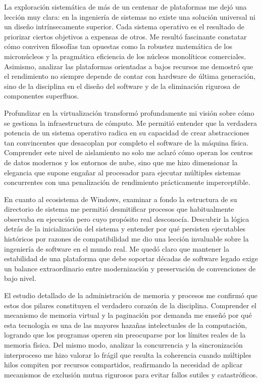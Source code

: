 \documentclass[12pt]{article}
\begin{document}
La exploración sistemática de más de un centenar de plataformas me dejó una lección muy clara: en la ingeniería de sistemas no existe una solución universal ni un diseño intrínsecamente superior. Cada sistema operativo es el resultado de priorizar ciertos objetivos a expensas de otros. Me resultó fascinante constatar cómo conviven filosofías tan opuestas como la robustez matemática de los micronúcleos y la pragmática eficiencia de los núcleos monolíticos comerciales. Asimismo, analizar las plataformas orientadas a bajos recursos me demostró que el rendimiento no siempre depende de contar con hardware de última generación, sino de la disciplina en el diseño del software y de la eliminación rigurosa de componentes superfluos.

Profundizar en la virtualización transformó profundamente mi visión sobre cómo se gestiona la infraestructura de cómputo. Me permitió entender que la verdadera potencia de un sistema operativo radica en su capacidad de crear abstracciones tan convincentes que desacoplan por completo el software de la máquina física. Comprender este nivel de aislamiento no solo me aclaró cómo operan los centros de datos modernos y los entornos de nube, sino que me hizo dimensionar la elegancia que supone engañar al procesador para ejecutar múltiples sistemas concurrentes con una penalización de rendimiento prácticamente imperceptible.

En cuanto al ecosistema de Windows, examinar a fondo la estructura de su directorio de sistema me permitió desmitificar procesos que habitualmente observaba en ejecución pero cuyo propósito real desconocía. Descubrir la lógica detrás de la inicialización del sistema y entender por qué persisten ejecutables históricos por razones de compatibilidad me dio una lección invaluable sobre la ingeniería de software en el mundo real. Me quedó claro que mantener la estabilidad de una plataforma que debe soportar décadas de software legado exige un balance extraordinario entre modernización y preservación de convenciones de bajo nivel.

El estudio detallado de la administración de memoria y procesos me confirmó que estos dos pilares constituyen el verdadero corazón de la disciplina. Comprender el mecanismo de memoria virtual y la paginación por demanda me enseñó por qué esta tecnología es una de las mayores hazañas intelectuales de la computación, logrando que los programas operen sin preocuparse por los límites reales de la memoria física. Del mismo modo, analizar la concurrencia y la sincronización interproceso me hizo valorar lo frágil que resulta la coherencia cuando múltiples hilos compiten por recursos compartidos, reafirmando la necesidad de aplicar mecanismos de exclusión mutua rigurosos para evitar fallos sutiles y catastróficos.
\end{document}
